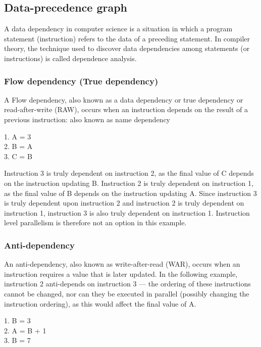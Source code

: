 \subsection{Data-precedence graph}


A data dependency\cite{Datadepe9:online} in computer science is a situation in which a program statement (instruction) refers to the data of a preceding statement. In compiler theory, the technique used to discover data dependencies among statements (or instructions) is called dependence analysis.


\subsubsection{Flow dependency (True dependency)}

A Flow dependency, also known as a data dependency or true dependency or read-after-write (RAW), occurs when an instruction depends on the result of a previous instruction: also known as name dependency


\begin{center}
1. A = 3\\
2. B = A\\
3. C = B
\end{center}
Instruction 3 is truly dependent on instruction 2, as the final value of C depends on the instruction updating B. Instruction 2 is truly dependent on instruction 1, as the final value of B depends on the instruction updating A. Since instruction 3 is truly dependent upon instruction 2 and instruction 2 is truly dependent on instruction 1, instruction 3 is also truly dependent on instruction 1. Instruction level parallelism is therefore not an option in this example.

\subsubsection{Anti-dependency}
An anti-dependency, also known as write-after-read (WAR), occurs when an instruction requires a value that is later updated. In the following example, instruction 2 anti-depends on instruction 3 — the ordering of these instructions cannot be changed, nor can they be executed in parallel (possibly changing the instruction ordering), as this would affect the final value of A.
\begin{center}
    1. B = 3 \\
    2. A = B + 1 \\
    3. B = 7
    \end{center}

